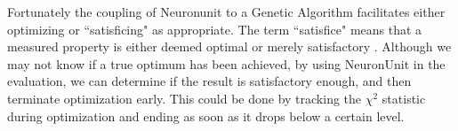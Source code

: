 Fortunately the coupling of Neuronunit to a Genetic Algorithm facilitates either optimizing or ``satisficing" as appropriate.
The term ``satisfice" means that a measured property is either deemed optimal or merely satisfactory \citep{simon1956rational}.
Although we may not know if a true optimum has been achieved, by using NeuronUnit in the evaluation, we can determine if the result is satisfactory enough, and then terminate optimization early.
This could be done by tracking the $\chi^2$ statistic during optimization and ending as soon as it drops below a certain level.
